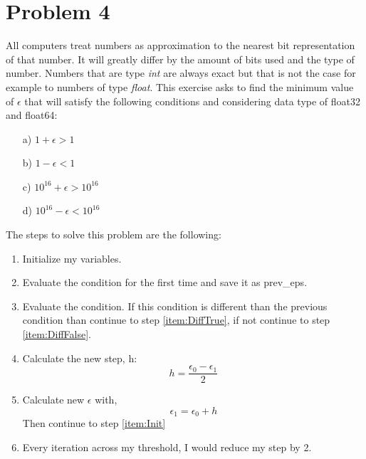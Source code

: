 \section*{Problem 4}
\label{sec:problem4}
All computers treat numbers as approximation to the nearest bit representation of that number. It will greatly differ by the amount of bits used and the type of number. Numbers that are type \textit{int} are always exact but that is not the case for example to numbers of type \textit{float}. This exercise asks to find the minimum value of $\epsilon$ that will satisfy the following conditions and considering data type of float32 and float64:
\begin{enumerate}
    \item[a)] $1 + \epsilon > 1$
    \item[b)] $1 - \epsilon < 1$
    \item[c)] $10^16 +\epsilon > 10^16$
    \item[d)] $10^16 -\epsilon < 10^16$
\end{enumerate}

The steps to solve this problem are the following:

\begin{enumerate}
    \item Initialize my variables.
    \item Evaluate the condition for the first time and save it as prev\_eps.
    \item Evaluate the condition. 
    \label{item:Init}
    If this condition is different than the previous condition than continue to step \ref{item:DiffTrue}, if not continue to step \ref{item:DiffFalse}.
    \item Calculate the new step, h:
    \label{item:DiffTrue}
        \begin{equation}
            h = \frac{\epsilon_0 - \epsilon_1}{2}
        \end{equation}
    \item Calculate new $\epsilon$ with,
        \label{item:DiffFalse}
        \begin{equation}
            \epsilon_1=\epsilon_0 + h
        \end{equation}
        Then continue to step \ref{item:Init}
    \item 
    
Every iteration across my threshold, I would reduce my step by 2.  
    
\end{enumerate}

